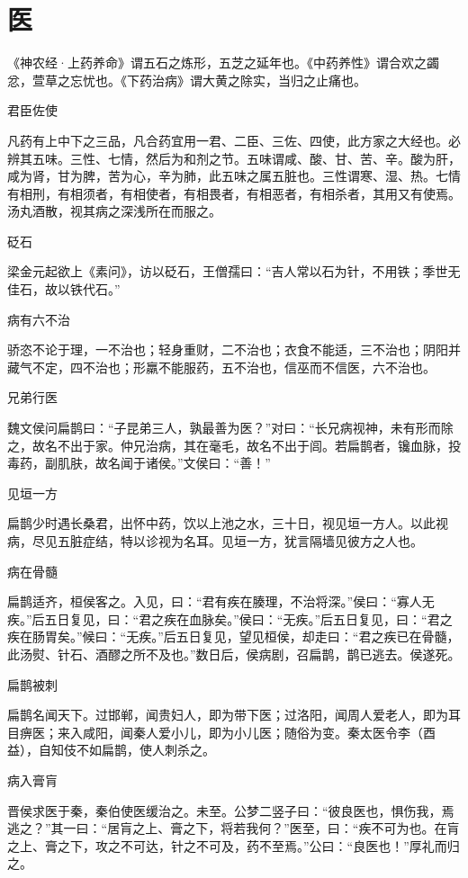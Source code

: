 \documentclass[a4paper,12pt,UTF8,twoside]{ctexbook}
\begin{document}
    \chapter{医}
    
    《神农经·上药养命》谓五石之炼形，五芝之延年也。《中药养性》谓合欢之蠲忿，萱草之忘忧也。《下药治病》谓大黄之除实，当归之止痛也。
    
    君臣佐使
    
    凡药有上中下之三品，凡合药宜用一君、二臣、三佐、四使，此方家之大经也。必辨其五味。三性、七情，然后为和剂之节。五味谓咸、酸、甘、苦、辛。酸为肝，咸为肾，甘为脾，苦为心，辛为肺，此五味之属五脏也。三性谓寒、湿、热。七情有相刑，有相须者，有相使者，有相畏者，有相恶者，有相杀者，其用又有使焉。汤丸酒散，视其病之深浅所在而服之。
    
    砭石
    
    梁金元起欲上《素问》，访以砭石，王僧孺曰：“吉人常以石为针，不用铁；季世无佳石，故以铁代石。”
    
    病有六不治
    
    骄恣不论于理，一不治也；轻身重财，二不治也；衣食不能适，三不治也；阴阳并藏气不定，四不治也；形羸不能服药，五不治也，信巫而不信医，六不治也。
    
    兄弟行医
    
    魏文侯问扁鹊曰：“子昆弟三人，孰最善为医？”对曰：“长兄病视神，未有形而除之，故名不出于家。仲兄治病，其在毫毛，故名不出于闾。若扁鹊者，镵血脉，投毒药，副肌肤，故名闻于诸侯。”文侯曰：“善！”
    
    见垣一方
    
    扁鹊少时遇长桑君，出怀中药，饮以上池之水，三十日，视见垣一方人。以此视病，尽见五脏症结，特以诊视为名耳。见垣一方，犹言隔墙见彼方之人也。
    
    病在骨髓
    
    扁鹊适齐，桓侯客之。入见，曰：“君有疾在腠理，不治将深。”侯曰：“寡人无疾。”后五日复见，曰：“君之疾在血脉矣。”侯曰：“无疾。”后五日复见，曰：“君之疾在肠胃矣。”候曰：“无疾。”后五日复见，望见桓侯，却走曰：“君之疾已在骨髓，此汤熨、针石、酒醪之所不及也。”数日后，侯病剧，召扁鹊，鹊已逃去。侯遂死。
    
    扁鹊被刺
    
    扁鹊名闻天下。过邯郸，闻贵妇人，即为带下医；过洛阳，闻周人爱老人，即为耳目痹医；来入咸阳，闻秦人爱小儿，即为小儿医；随俗为变。秦太医令李（酉益），自知伎不如扁鹊，使人刺杀之。
    
    病入膏肓
    
    晋侯求医于秦，秦伯使医缓治之。未至。公梦二竖子曰：“彼良医也，惧伤我，焉逃之？”其一曰：“居肓之上、膏之下，将若我何？”医至，曰：“疾不可为也。在肓之上、膏之下，攻之不可达，针之不可及，药不至焉。”公曰：“良医也！”厚礼而归之。
    
\end{document}
